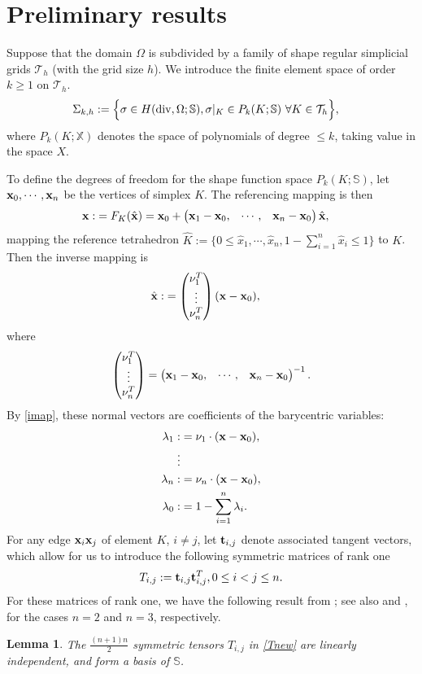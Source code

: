 \documentclass{amsart}
\newtheorem{lemma}{Lemma}[section]
\def\a#1{\begin{align*}#1\end{align*}} \def\an#1{\begin{align}#1\end{align}}
\def\p#1{\begin{pmatrix}#1\end{pmatrix}} \def\c{\operatorname{curl}}
\numberwithin{table}{section}
\numberwithin{figure}{section}
\def\boxit#1{\vbox{\hrule height1pt \hbox{\vrule width1pt\kern1pt
     #1\kern1pt\vrule width1pt}\hrule height1pt }}
\def\lab#1{\boxit{\small #1}\label{#1}}
\def\mref#1{\boxit{\small #1}\ref{#1}}
\def\meqref#1{\boxit{\small #1}\eqref{#1}}
\def\lab#1{\label{#1}} \def\mref#1{\ref{#1}} \def\meqref#1{\eqref{#1}}
\begin{document}
\section{Preliminary results}
Suppose that the  domain $\Omega$ is subdivided by a family of shape regular simplicial
 grids  $\mathcal{T}_h$ (with the grid size $h$).
We introduce the finite element space of order $k\geq 1$  on $\mathcal{T}_h$.
\an{\lab{Sh}
 \Sigma_{k,h} :=\Big\{ \sigma
    &\in H(\d,\Omega; \mathbb{S}),   \sigma|_K\in P_k(K;  \mathbb{S})
     \   \forall K\in\mathcal{T}_h \Big\}, }
     where $P_k(K;  \mathbb{X})$ denotes the space  of polynomials of degree $\leq k$, taking value in the space $X$.

    To define the degrees of freedom  for the shape function space $P_k(K;  \mathbb{S})$, let $\mathbf{x}_0, \cdots, \mathbf{x}_n$  be the  vertices of
    simplex  $K$.
The referencing mapping is then
\a{  \b x: &= F_K(\hat {\b x})
     = \b x_0 + \p{ \b x_1 -\b x_0, &
                     \cdots,&
                     \b x_n -\b x_0  } \hat{\b x}, }
      mapping the reference tetrahedron $\hat K:=\{ 0 \le \hat x_1, \cdots, \hat x_n,
          1-\sum\limits_{i=1}^n\hat x_i \le 1 \}$ to $K$.
   Then the inverse mapping is
\an{ \lab{imap}  \hat {\b x}: &= \p{\b \nu_1^T\\ \vdots \\ \b \nu_n^T} (\b x-\b x_0), }
where
 \an{\lab{nnt} \p{\b \nu_1^T\\ \vdots \\ \b \nu_n^T }=\p{ \b x_1 -\b x_0, &
      \cdots,  &
                     \b x_n -\b x_0}^{-1}. }
By \meqref{imap}, these normal vectors
        are coefficients of the barycentric variables:
  \a{ \lambda_1: &=  \b \nu_1 \cdot (\b x-\b x_0), \\
     \vdots & \\
      \lambda_n: &= \b \nu_n \cdot (\b x-\b x_0), \\
    \lambda_0: &= 1-\sum\limits_{i=1}^n\lambda_i. }
For any edge $\mathbf{x}_i\mathbf{x}_j$ of element $K$, $i\not =j$, let $\mathbf{t}_{i,j}$ denote  associated tangent vectors, which allow for us to
 introduce the following symmetric matrices of rank one
 \begin{equation}\label{Tnew}
 T_{i,j}:=\mathbf{t}_{i,j}\mathbf{t}_{i,j}^T,  0\leq i< j\leq n.
 \end{equation}
For these matrices of rank one, we have the following  result from \cite{Hu2014}; see also \cite{Hu-Zhang2014a} and
 \cite{Hu-Zhang2014b}, for the cases $n=2$ and $n=3$, respectively.
 \begin{lemma}\lab{lemma2.1}
   The $\frac{(n+1)n}{2}$ symmetric tensors $T_{i,j}$ in \meqref{Tnew} are linearly independent, and
    form a basis of $\mathbb{S}$.
\end{lemma}
\end{document}
